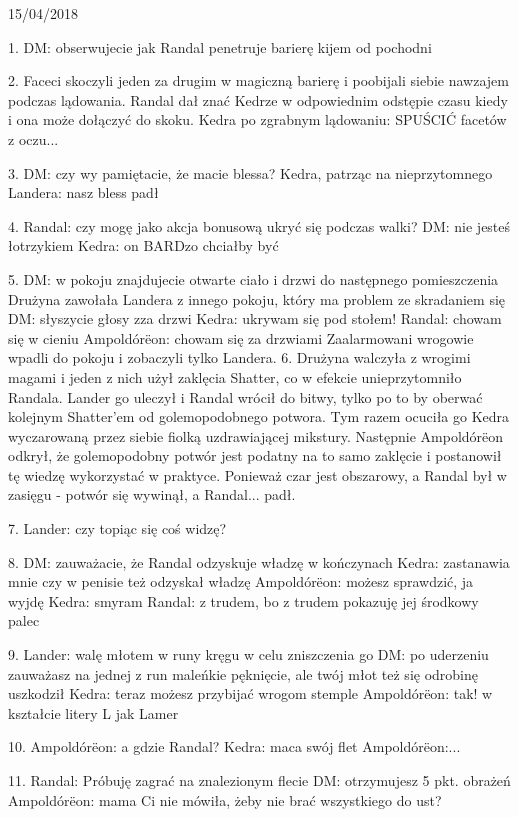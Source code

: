 \documentclass[10pt,twoside,twocolumn]{book}
\begin{document}
15/04/2018

1. DM: obserwujecie jak Randal penetruje barierę kijem od pochodni

2. Faceci skoczyli jeden za drugim w magiczną barierę i poobijali siebie nawzajem podczas lądowania. Randal dał znać Kedrze w odpowiednim odstępie czasu kiedy i ona może dołączyć do skoku.
Kedra po zgrabnym lądowaniu: SPUŚCIĆ facetów z oczu...

3. DM: czy wy pamiętacie, że macie blessa?
Kedra, patrząc na nieprzytomnego Landera: nasz bless padł

4. Randal: czy mogę jako akcja bonusową ukryć się podczas walki?
DM: nie jesteś łotrzykiem
Kedra: on BARDzo chciałby być

5. DM: w pokoju znajdujecie otwarte ciało i drzwi do następnego pomieszczenia
Drużyna zawołała Landera z innego pokoju, który ma problem ze skradaniem się
DM: słyszycie głosy zza drzwi
Kedra: ukrywam się pod stołem!
Randal: chowam się w cieniu
Ampoldórëon: chowam się za drzwiami
Zaalarmowani wrogowie wpadli do pokoju i zobaczyli tylko Landera.
6. Drużyna walczyła z wrogimi magami i jeden z nich użył zaklęcia Shatter, co w efekcie unieprzytomniło Randala. Lander go uleczył i Randal wrócił do bitwy, tylko po to by oberwać kolejnym Shatter'em od golemopodobnego potwora. Tym razem ocuciła go Kedra wyczarowaną przez siebie fiolką uzdrawiającej mikstury. Następnie Ampoldórëon odkrył, że golemopodobny potwór jest podatny na to samo zaklęcie i postanowił tę wiedzę wykorzystać w praktyce. Ponieważ czar jest obszarowy, a Randal był w zasięgu - potwór się wywinął, a Randal... padł.

7. Lander: czy topiąc się coś widzę?

8. DM: zauważacie, że Randal odzyskuje władzę w kończynach
Kedra: zastanawia mnie czy w penisie też odzyskał władzę
Ampoldórëon: możesz sprawdzić, ja wyjdę
Kedra: smyram
Randal: z trudem, bo z trudem pokazuję jej środkowy palec

9. Lander: walę młotem w runy kręgu w celu zniszczenia go
DM: po uderzeniu zauważasz na jednej z run maleńkie pęknięcie, ale twój młot też się odrobinę uszkodził
Kedra: teraz możesz przybijać wrogom stemple
Ampoldórëon: tak! w kształcie litery L jak Lamer

10. Ampoldórëon: a gdzie Randal?
Kedra:  maca swój flet
Ampoldórëon:...

11. Randal: Próbuję zagrać na znalezionym flecie
DM: otrzymujesz 5 pkt. obrażeń
Ampoldórëon: mama Ci nie mówiła, żeby nie brać wszystkiego do ust?
\end{document}
